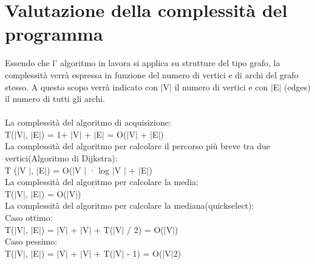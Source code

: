\documentclass[11pt, a4paper, titlepage, block]{article}
\begin{document}
\section{Valutazione della complessit\`{a} del programma}
Essendo che l' algoritmo in lavora si applica su strutture del tipo grafo, la complessità verrà espressa in 
funzione del numero di vertici e di archi del grafo stesso. A questo scopo verrà indicato con $|$V$|$ il 
numero di vertici e con $|$E$|$ (edges) il numero di tutti gli archi.\\
\\
La complessità del algoritmo di acquisizione:\\
\indent T($|$V$|$, $|$E$|$) = 1+ $|$V$|$ + $|$E$|$ = O($|$V$|$ + $|$E$|$)\\
La complessità del algoritmo per calcolare il percorso pi\`{u} breve tra due vertici(Algoritmo di Dijkstra):\\
\indent T ($|$V $|$, $|$E$|$) = O($|$V $|$ · log $|$V $|$ + $|$E$|$)\\
La complessità del algoritmo per calcolare la media:\\
\indent T($|$V$|$, $|$E$|$) = O($|$V$|$)\\
La complessità del algoritmo per calcolare la mediana(quickselect):\\
\indent Caso ottimo:\\
\indent \indent T($|$V$|$, $|$E$|$) = $|$V$|$ + $|$V$|$ + T($|$V$|$ / 2) = O($|$V$|$)\\
\indent Caso pessimo:\\
\indent \indent T($|$V$|$, $|$E$|$) = $|$V$|$ + $|$V$|$ + T($|$V$|$ - 1) = O($|$V$|$2)\\
	\newpage
\end{document}
